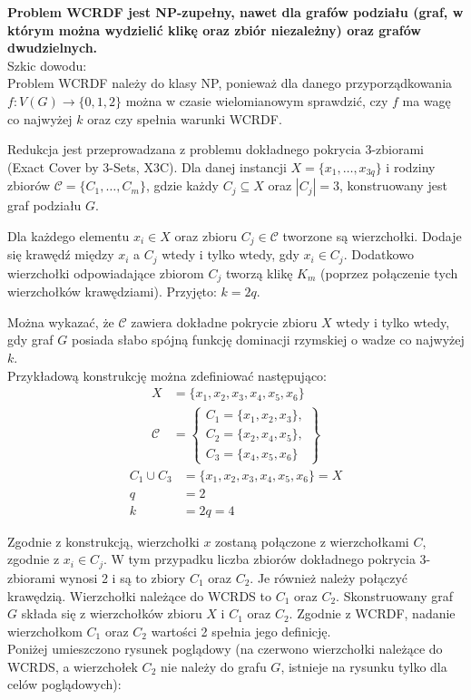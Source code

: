 \textbf{Problem WCRDF jest NP-zupełny, nawet dla grafów podziału (graf, w którym można wydzielić klikę oraz zbiór niezależny) oraz grafów dwudzielnych.}\\

Szkic dowodu:\\
Problem WCRDF należy do klasy NP, ponieważ dla danego przyporządkowania $f : V(G) \rightarrow \{0, 1, 2\}$ można w czasie wielomianowym sprawdzić, czy $f$ ma wagę co najwyżej $k$ oraz czy spełnia warunki WCRDF.

Redukcja jest przeprowadzana z problemu dokładnego pokrycia 3-zbiorami (Exact Cover by 3-Sets, X3C). Dla danej instancji $X = \{x_1, \dots, x_{3q}\}$ i rodziny zbiorów $\mathcal{C} = \{C_1, \dots, C_m\}$, gdzie każdy $C_j \subseteq X$ oraz $|C_j| = 3$, konstruowany jest graf podziału $G$.

Dla każdego elementu $x_i \in X$ oraz zbioru $C_j \in \mathcal{C}$ tworzone są wierzchołki. Dodaje się krawędź między $x_i$ a $C_j$ wtedy i tylko wtedy, gdy $x_i \in C_j$. Dodatkowo wierzchołki odpowiadające zbiorom $C_j$ tworzą klikę $K_m$ (poprzez połączenie tych wierzchołków krawędziami). Przyjęto: $k = 2q$.

Można wykazać, że $\mathcal{C}$ zawiera dokładne pokrycie zbioru $X$ wtedy i tylko wtedy, gdy graf $G$ posiada słabo spójną funkcję dominacji rzymskiej o wadze co najwyżej $k$.\\

Przykładową konstrukcję można zdefiniować następująco:
\begin{align*}
X &= \{x_1, x_2, x_3, x_4, x_5, x_6\} \\
\mathcal{C} &= \left\{
\begin{array}{l}
C_1 = \{x_1, x_2, x_3\}, \\
C_2 = \{x_2, x_4, x_5\}, \\
C_3 = \{x_4, x_5, x_6\}
\end{array}
\right\}
\end{align*}
\begin{align*}
C_1 \cup C_3 &= \{x_1, x_2, x_3, x_4, x_5, x_6\} = X \\
q &= 2 \\
k &= 2q = 4
\end{align*}

Zgodnie z konstrukcją, wierzchołki $x$ zostaną połączone z wierzchołkami $C$, zgodnie z  $x_i \in C_j$. W tym przypadku liczba zbiorów dokładnego pokrycia 3-zbiorami wynosi 2 i są to zbiory $C_1$ oraz $C_2$. Je również należy połączyć krawędzią. Wierzchołki należące do WCRDS to $C_1$ oraz $C_2$. Skonstruowany graf $G$ składa się z wierzchołków zbioru $X$ i $C_1$ oraz $C_2$. Zgodnie z WCRDF, nadanie wierzchołkom $C_1$ oraz $C_2$ wartości 2 spełnia jego definicję. \\
Poniżej umieszczono rysunek poglądowy (na czerwono wierzchołki należące do WCRDS, a wierzchołek $C_2$ nie należy do grafu $G$, istnieje na rysunku tylko dla celów poglądowych):

